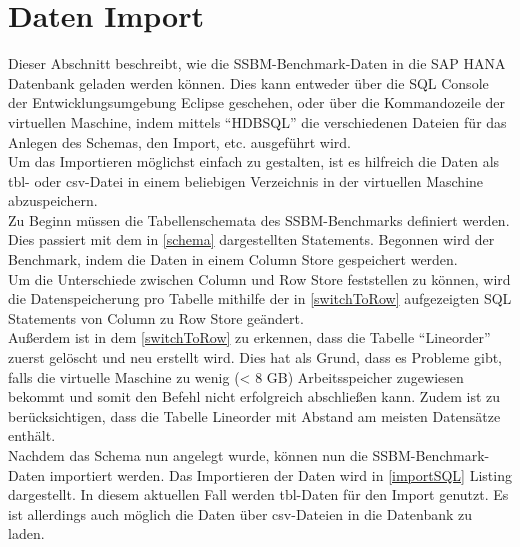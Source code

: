 \section{Daten Import}
Dieser Abschnitt beschreibt, wie die SSBM-Benchmark-Daten in die SAP HANA Datenbank geladen werden können. Dies kann entweder über die SQL Console der Entwicklungsumgebung Eclipse geschehen, oder über die Kommandozeile der virtuellen Maschine, indem mittels \enquote{HDBSQL} die verschiedenen Dateien für das Anlegen des Schemas, den Import, etc. ausgeführt wird.
\\Um das Importieren möglichst einfach zu gestalten, ist es hilfreich die Daten als tbl- oder csv-Datei in einem beliebigen Verzeichnis in der virtuellen Maschine abzuspeichern.
\\Zu Beginn müssen die Tabellenschemata des SSBM-Benchmarks definiert werden. Dies passiert mit dem in \autoref{schema} dargestellten Statements. Begonnen wird der Benchmark, indem die Daten in einem Column Store gespeichert werden.\\
Um die Unterschiede zwischen Column und Row Store feststellen zu können, wird die Datenspeicherung pro Tabelle mithilfe der in \autoref{switchToRow} aufgezeigten SQL Statements von Column zu Row Store geändert. \\Außerdem ist in dem \autoref{switchToRow} zu erkennen, dass die Tabelle \enquote{Lineorder} zuerst gelöscht und neu erstellt wird. Dies hat als Grund, dass es Probleme gibt, falls die virtuelle Maschine zu wenig (< 8 GB) Arbeitsspeicher zugewiesen bekommt und somit den Befehl nicht erfolgreich abschließen kann. Zudem ist zu berücksichtigen, dass die Tabelle Lineorder mit Abstand am meisten Datensätze enthält.\\
Nachdem das Schema nun angelegt wurde, können nun die SSBM-Benchmark-Daten importiert werden. Das Importieren der Daten wird in \autoref{importSQL} Listing dargestellt. In diesem aktuellen Fall werden tbl-Daten für den Import genutzt. Es ist allerdings auch möglich die Daten über csv-Dateien in die Datenbank zu laden.


